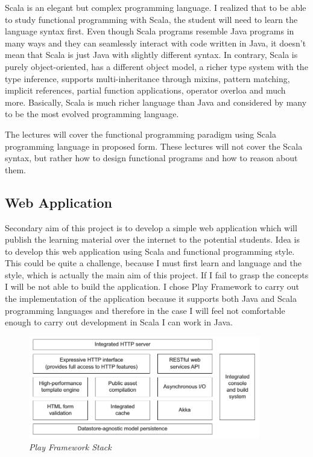 \documentclass[12pt,twoside,a4paper]{report}
\begin{document}
Scala is an elegant but complex programming language. I realized that to be able to study functional programming with Scala, the student will need to learn the language syntax first. Even though Scala programs resemble Java programs in many ways and they can seamlessly interact with code written in Java\cite{17}, it doesn't mean that Scala is just Java with slightly different syntax. In contrary, Scala is purely object-oriented, has a different object model, a richer type system with the type inference, supports multi-inheritance through mixins, pattern matching, implicit references, partial function applications, operator overloa and much more. Basically, Scala is much richer language than Java and considered by many to be the most evolved programming language.

The lectures will cover the functional programming paradigm using Scala programming language in proposed form. These lectures will not cover the Scala syntax, but rather how to design functional programs and how to reason about them.

\subsection{Web Application}\label{3.2.2}
Secondary aim of this project is to develop a simple web application which will publish the learning material over the internet to the potential students. Idea is to develop this web application using Scala and functional programming style. This could be quite a challenge, because I must first learn and language and the style, which is actually the main aim of this project. If I fail to grasp the concepts I will be not able to build the application. I chose Play Framework to carry out the implementation of the application because it supports both Java and Scala programming languages and therefore in the case I will feel not comfortable enough to carry out development in Scala I can work in Java.

\begin{figure}[!ht]
	\centering
		\includegraphics[width=0.9\textwidth, totalheight=8cm]
		{play_stack}
	\caption{\textit{Play Framework Stack}}
	\label{f3.1}
\end{figure}
\end{document}
